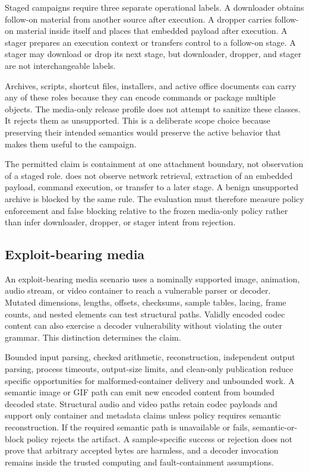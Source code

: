 Staged campaigns require three separate operational labels. A downloader
obtains follow-on material from another source after execution. A dropper
carries follow-on material inside itself and places that embedded payload after
execution. A stager prepares an execution context or transfers control to a
follow-on stage. A stager may download or drop its next stage, but downloader,
dropper, and stager are not interchangeable labels.

Archives, scripts, shortcut files, installers, and active office documents can
carry any of these roles because they can encode commands or package multiple
objects. The media-only release profile does not attempt to sanitize these
classes. It rejects them as unsupported. This is a deliberate scope choice
because preserving their intended semantics would preserve the active behavior
that makes them useful to the campaign.

The permitted claim is containment at one attachment boundary, not observation
of a staged role. \AFD{} does not observe network retrieval, extraction of an
embedded payload, command execution, or transfer to a later stage. A benign
unsupported archive is blocked by the same rule. The evaluation must therefore
measure policy enforcement and false blocking relative to the frozen media-only
policy rather than infer downloader, dropper, or stager intent from rejection.

\subsection{Exploit-bearing media}

An exploit-bearing media scenario uses a nominally supported image, animation,
audio stream, or video container to reach a vulnerable parser or decoder.
Mutated dimensions, lengths, offsets, checksums, sample tables, lacing, frame
counts, and nested elements can test structural paths. Validly encoded codec
content can also exercise a decoder vulnerability without violating the outer
grammar. This distinction determines the claim.

Bounded input parsing, checked arithmetic, reconstruction, independent output
parsing, process timeouts, output-size limits, and clean-only publication reduce
specific opportunities for malformed-container delivery and unbounded work.
A semantic image or GIF path can emit new encoded content from bounded decoded
state. Structural audio and video paths retain codec payloads and support only
container and metadata claims unless policy requires semantic reconstruction.
If the required semantic path is unavailable or fails, semantic-or-block policy
rejects the artifact. A sample-specific success or rejection does not prove
that arbitrary accepted bytes are harmless, and a decoder invocation remains
inside the trusted computing and fault-containment assumptions.

